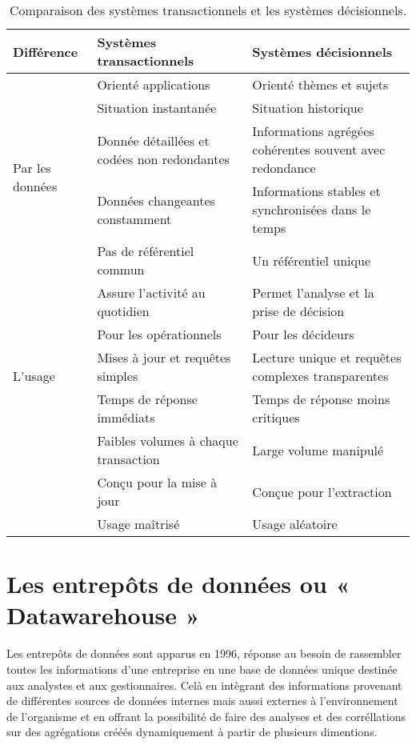 \begin{table}[H]
    \centering
    \caption{Comparaison des systèmes transactionnels et les systèmes décisionnels.}
    \begin{tabular}[t]{|p{3cm}|p{6cm}|p{6cm}|} 
        \hline
        \textbf{Différence} & \textbf{Systèmes transactionnels} & \textbf{Systèmes décisionnels} \\
        \hline\hline
        \multirow{5}{5em}{Par les données} & Orienté applications & Orienté thèmes et sujets \\
        & Situation instantanée & Situation historique \\ 
        & Donnée détaillées et codées non redondantes & Informations agrégées cohérentes souvent avec redondance \\ 
        & Données changeantes constamment & Informations stables et synchronisées dans le temps \\ 
        & Pas de référentiel commun & Un référentiel unique \\ 
        \hline
        \multirow{5}{5em}{L’usage} & Assure l’activité au quotidien & Permet l’analyse et la prise de décision \\
        & Pour les opérationnels & Pour les décideurs \\ 
        & Mises à jour et requêtes simples & Lecture unique et requêtes complexes
        transparentes \\ 
        & Temps de réponse immédiats & Temps de réponse moins critiques \\ 
        & Faibles volumes à chaque transaction & Large volume manipulé \\ 
        & Conçu pour la mise à jour & Conçue pour l’extraction \\ 
        & Usage maîtrisé & Usage aléatoire \\ 
        \hline\hline
    \end{tabular}
    \label{tab:comparatifdecisonneltransactionnel}
\end{table}%


\section{Les entrepôts de données ou « Datawarehouse »}

Les entrepôts de données sont apparus en 1996, réponse au besoin de rassembler toutes les informations d’une entreprise en une base de données unique destinée aux analystes et aux gestionnaires. Celà en intègrant des informations provenant de différentes sources de données internes mais aussi externes à l’environnement de l’organisme et en offrant la possibilité de faire des analyses et des corréllations sur des agrégations crééés dynamiquement à partir de plusieurs dimentions.
